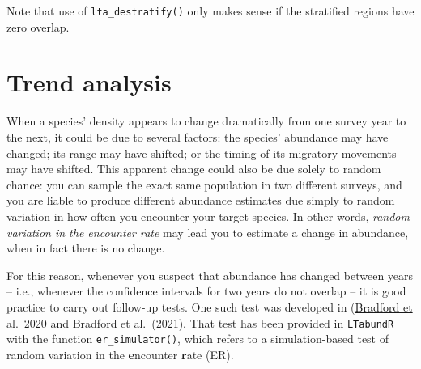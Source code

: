 \documentclass[
]{book}
\newenvironment{Shaded}{\begin{snugshade}}{\end{snugshade}}
\newcommand{\DataTypeTok}[1]{\textcolor[rgb]{0.13,0.29,0.53}{#1}}
\newcommand{\DecValTok}[1]{\textcolor[rgb]{0.00,0.00,0.81}{#1}}
\newcommand{\FloatTok}[1]{\textcolor[rgb]{0.00,0.00,0.81}{#1}}
\newcommand{\KeywordTok}[1]{\textcolor[rgb]{0.13,0.29,0.53}{\textbf{#1}}}
\newcommand{\NormalTok}[1]{#1}
\newcommand{\OperatorTok}[1]{\textcolor[rgb]{0.81,0.36,0.00}{\textbf{#1}}}
\newcommand{\OtherTok}[1]{\textcolor[rgb]{0.56,0.35,0.01}{#1}}
\newcommand{\StringTok}[1]{\textcolor[rgb]{0.31,0.60,0.02}{#1}}
\begin{document}
\begin{Shaded}
\end{Shaded}

Note that use of \texttt{lta\_destratify()} only makes sense if the stratified regions have zero overlap.

\hypertarget{trend-analysis}{%
\chapter{Trend analysis}\label{trend-analysis}}

When a species' density appears to change dramatically from one survey year to the next, it could be due to several factors: the species' abundance may have changed; its range may have shifted; or the timing of its migratory movements may have shifted. This apparent change could also be due solely to random chance: you can sample the exact same population in two different surveys, and you are liable to produce different abundance estimates due simply to random variation in how often you encounter your target species. In other words, \emph{random variation in the encounter rate} may lead you to estimate a change in abundance, when in fact there is no change.

For this reason, whenever you suspect that abundance has changed between years -- i.e., whenever the confidence intervals for two years do not overlap -- it is good practice to carry out follow-up tests. One such test was developed in (\href{https://www.fisheries.noaa.gov/inport/item/59592}{Bradford et al.~2020} and Bradford et al.~(2021). That test has been provided in \texttt{LTabundR} with the function \texttt{er\_simulator()}, which refers to a simulation-based test of random variation in the \textbf{e}ncounter \textbf{r}ate (ER).
\end{document}
